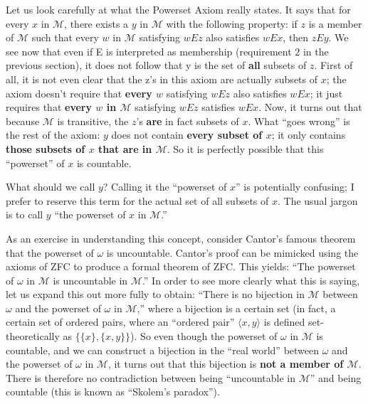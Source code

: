 \documentclass[10pt]{article}
\newcommand\axiom[1]{\textmd{#1}}
\theoremstyle{definition}
\begin{document}
Let us look carefully at what the Powerset Axiom really states. It says that for every $x$ in $\mathcal M$, there exists a $y$ in $\mathcal M$ with the following property: if $z$ is a member of $\mathcal M$ such that every $w$ in $\mathcal M$ satisfying $w E z$ also satisfies $w E x$, then $z E y$. We see now that even if E is interpreted as membership (requirement $2$ in the previous section), it does not follow that y is the set of \textbf{all} subsets of $z$. First of all, it is not even clear that the z's in this axiom are actually subsets of $x$; the axiom doesn't require that \textbf{every $w$} satisfying $w E z$ also satisfies $w E x$; it just requires that \textbf{every $w$ in $\mathcal M$} satisfying $w E z$ satisfies $w E x$. Now, it turns out that because $\mathcal M$ is transitive, the $z$'s \textbf{are} in fact subsets of $x$. What ``goes wrong'' is the rest of the axiom: $y$ does not contain \textbf{every subset of $x$}; it only contains \textbf{those subsets of $x$ that are in $\mathcal M$}. So it is perfectly possible that this ``powerset'' of $x$ is countable.

What should we call $y$? Calling it the ``powerset of $x$'' is potentially confusing; I prefer to reserve this term for the actual set of all subsets of $x$. The usual jargon is to call $y$ ``the powerset of $x$ in $\mathcal M$.''

As an exercise in understanding this concept, consider Cantor's famous theorem that the powerset of $\omega$ is uncountable. Cantor's proof can be mimicked using the axioms of \axiom{ZFC} to produce a formal theorem of \axiom{ZFC}. This yields: ``The powerset of $\omega$ in $\mathcal M$ is uncountable in $\mathcal M$.'' In order to see more clearly what this is saying, let us expand this out more fully to obtain: ``There is no bijection in $\mathcal M$ between $\omega$ and the powerset of $\omega$ in $\mathcal M$,'' where a bijection is a certain set (in fact, a certain set of ordered pairs, where an ``ordered pair'' $\langle x,y\rangle$ is defined set-theoretically as $\{\{x\}, \{x,y\}\}$). So even though the powerset of $\omega$ in $\mathcal M$ is countable, and we can construct a bijection in the ``real world'' between $\omega$ and the powerset of $\omega$ in $\mathcal M$, it turns out that this bijection is \textbf{not a member of $\mathcal M$}. There is therefore no contradiction between being ``uncountable in $\mathcal M$'' and being countable (this is known as ``Skolem's paradox'').
\end{document}
